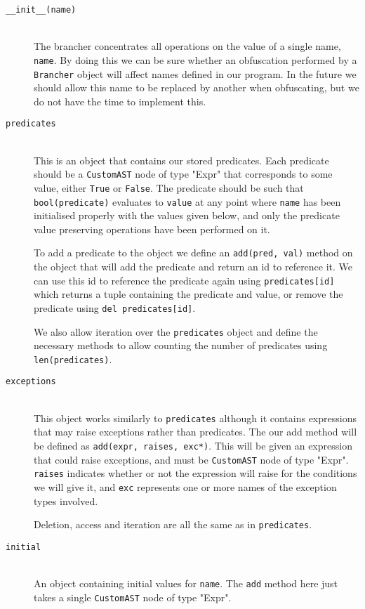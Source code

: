 \documentclass[twoside,a4paper]{report}
\begin{document}
\begin{description}
\item[\texttt{\_\_init\_\_(name)}] \hfill \\
The brancher concentrates all operations on the value of a single name, \texttt{name}. By doing this we can be sure whether an obfuscation performed by a
\texttt{Brancher} object will affect names defined in our program. In the future we should allow this name to be replaced by another when obfuscating, but
we do not have the time to implement this.

\item[\texttt{predicates}] \hfill \\
This is an object that contains our stored predicates. Each predicate should be a \texttt{CustomAST} node of type "Expr" that corresponds to some value, either
\texttt{True} or \texttt{False}. The predicate should be such that \texttt{bool(predicate)} evaluates to \texttt{value} at any point where \texttt{name} has
been initialised properly with the values given below, and only the predicate value preserving operations have been performed on it.

To add a predicate to the object we define an \texttt{add(pred, val)} method on the object that will add the predicate and return an id to reference it. We
can use this id to reference the predicate again using \texttt{predicates[id]} which returns a tuple containing the predicate and value, or remove the
predicate using \texttt{del predicates[id]}.

We also allow iteration over the \texttt{predicates} object and define the necessary methods to allow counting the number of predicates using
\texttt{len(predicates)}.

\item[\texttt{exceptions}] \hfill \\
This object works similarly to \texttt{predicates} although it contains expressions that may raise exceptions rather than predicates. The our add method
will be defined as \texttt{add(expr, raises, exc*)}. This will be given an expression that could raise exceptions, and must be \texttt{CustomAST} node of
type "Expr". \texttt{raises} indicates whether or not the expression will raise for the conditions we will give it, and \texttt{exc} represents one or more
names of the exception types involved.

Deletion, access and iteration are all the same as in \texttt{predicates}.

\item[\texttt{initial}] \hfill \\
An object containing initial values for \texttt{name}. The \texttt{add} method here just takes a single \texttt{CustomAST} node of type "Expr".


\end{description}
\end{document}
